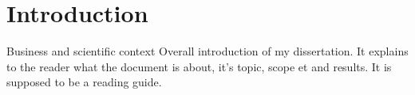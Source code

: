 \chapter*{Introduction}

Business and scientific context
Overall introduction of my dissertation.
It explains to the reader what the document is about, it's topic, scope et and results.
It is supposed to be a reading guide.

